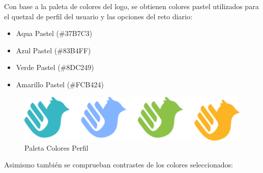 Con base a la paleta de colores del logo, se obtienen colores pastel utilizados para el quetzal de perfil del usuario y las opciones del reto diario:

\begin{itemize}

    \item Aqua Pastel (\#37B7C3)
    \item Azul Pastel (\#83B4FF)
    \item Verde Pastel (\#8DC249)
    \item Amarillo Pastel (\#FCB424)

\end{itemize}

\begin{figure} [H]
    \centering
    \includegraphics[width=0.5\linewidth]{figuras/paleta_colores_quetzal.png}
    \caption{Paleta Colores Perfil}
    \label{fig:enter-label}
\end{figure}

Asimismo también se comprueban contrastes de los colores seleccionados:

